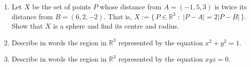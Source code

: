 \documentclass[12pt]{article}
\newcommand{\RR}{{\mathbb R}}  %
\begin{document}
\begin{enumerate}
\item Let $X$ be the set of points $P$ whose distance from $A=(-1,5,3)$ is twice its distance from $B=(6,2,-2)$.
  That is,
  $X := \{\,P\in\RR^3 \;:\; |P-A| = 2|P-B|\,\}$.
  Show that $X$ is a sphere and find its centre and radius.

\item Describe in words the region in $\RR^3$ represented by the equation $x^2+y^2=1$.


\item  Describe in words the region in $\RR^3$ represented by the equation $xyz=0$.


\end{enumerate}  
\end{document}
